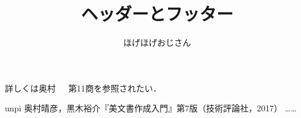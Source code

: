 \documentclass[a4paper, 11pt, uplatex]{jsarticle}
\begin{document}
\title{ヘッダーとフッター}
\author{ほげほげおじさん}
\maketitle

詳しくは奥村~\cite{微分書}　第11商を参照されたい．

\begin{thebibliography}{99}
	 unpi
	 奥村晴彦，黒木裕介『\LaTeXe 美文書作成入門』第7版（技術評論社，2017）
	\bibitem ……
\end{thebibliography}
\end{document}
